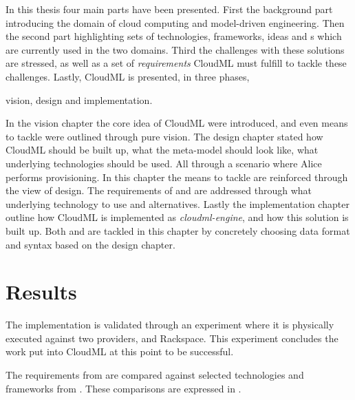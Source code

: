 
In this thesis four main parts have been presented.
First the background part introducing the domain of cloud computing and model-driven engineering.
Then the second part highlighting sets of technologies, frameworks, ideas and 
s which are currently used in the two domains.
Third the challenges with these solutions are stressed, as well as a set of \emph{requirements}
CloudML must fulfill to tackle these challenges.
Lastly, CloudML is presented, in three phases,
\begin{ii}
  \iitem vision,
  \iitem design and
  \iitem implementation.
\end{ii}

In the vision chapter the core idea of CloudML were introduced,
and even means to tackle  were outlined through pure vision.
The design chapter stated how CloudML should be built up,
what the meta-model should look like,
what underlying technologies should be used.
All through a scenario where Alice performs provisioning.
In this chapter the means to tackle  are reinforced through
the view of design.
The requirements of  and 
are addressed through what underlying technology to use and alternatives.
Lastly the implementation chapter outline how CloudML is implemented
as \emph{cloudml-engine}, and how this solution is built up.
Both  and  are tackled in this chapter
by concretely choosing data format and syntax based on the design chapter.

\section{Results}


The implementation is validated through an experiment where
it is physically executed against two providers,  and Rackspace.
This experiment concludes the work put into CloudML at this point to be successful.

The requirements from  are compared against selected
technologies and frameworks from .
These comparisons are expressed in .


